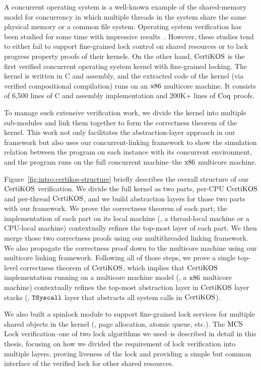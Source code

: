 A concurrent operating system is a well-known example of the shared-memory model for concurrency in which multiple threads in the system share the same physical memory or a common file system.
Operating system verification has been studied for some time with impressive results~\cite{klein2009sel4, xu16, hawblitzel10}.
However, these studies tend to either fail to support fine-grained lock control on shared resources or to lack progress property proofs of their kernels. 
On the other hand, $\mathrm{CertiKOS}$ is the first verified concurrent operating system kernel with fine-grained locking. 
The kernel is written in C and assembly, and the extracted code of the kernel (via verified compositional compilation) runs on an $\mathrm{x86}$ multicore machine. 
It consists of 6,500 lines of C and assembly implementation and 200K+ lines of $\mathrm{Coq}$ proofs. 

To manage such extensive verification work, we divide the kernel into multiple sub-modules and link them together to form the correctness theorem of the kernel. 
This work not only facilitates the abstraction-layer approach in our framework but also uses our concurrent-linking framework to show the simulation relation between the program on each instance with its concurrent environment, and the program runs on the full concurrent machine--the $\mathrm{x86}$ multicore machine. 

Figure~\ref{fig:intro:certikos-structure} briefly describes the overall structure of our $\mathrm{CertiKOS}$ verification. 
We divide the full kernel as two parts, per-CPU $\mathrm{CertiKOS}$ and per-thread $\mathrm{CertiKOS}$, 
and we build abstraction layers for those two parts with our framework. 
We prove the correctness theorem of each part; the implementation of each part on its local machine (\ie, a thread-local machine or a CPU-local machine) contextually refines the top-most layer of each part. 
We then merge those two correctness proofs using our multithreaded linking framework. 
We also propagate the correctness proof down to the multicore machine using our multicore linking framework. 
Following all of those steps, we prove a single top-level correctness theorem of $\mathrm{CertiKOS}$, which implies that $\mathrm{CertiKOS}$ implementation running on a multicore machine model (\ie, a $\mathrm{x86}$ multicore machine) contextually refines the top-most abstraction layer in $\mathrm{CertiKOS}$ layer stacks (\ie, ${{\mathrm{\texttt{TSyscall}}}}$ layer that abstracts all system calls in $\mathrm{CertiKOS}$). 




We also built a spinlock module to support fine-grained lock services for multiple shared objects in the kernel (\ie, page allocation, atomic queue, etc.).
The $\mathrm{MCS}$ Lock verification--one of two lock algorithms we used--is described in detail in this thesis, focusing on how we divided the requirement of lock verification into multiple layers, proving liveness of the lock and providing a simple but common interface of the verified lock for other shared resources. 

